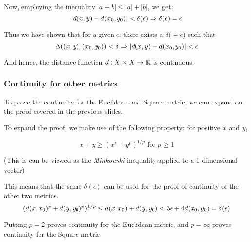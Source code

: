 \begin{frame}
    Now, employing the inequality \(|a+b|\leq |a|+|b|\), we get:
    \begin{equation*}
        |d(x, y) - d(x_0, y_0)| < \delta(\epsilon) \\
        \Rightarrow \delta(\epsilon) = \epsilon
    \end{equation*}

    Thus we have shown that for a given \(\epsilon\), there exists a \(\delta (= \epsilon\)) such that 
    \begin{equation*}
        \Delta((x, y), (x_0, y_0)) < \delta \Rightarrow |d(x, y) - d(x_0, y_0)| < \epsilon
    \end{equation*}

    And hence, the distance function \(d:X\times X \rightarrow \mathbb{R} \) is continuous.

\end{frame}


\begin{frame}
    \frametitle{Continuity for other metrics}

    To prove the continuity for the Euclidean and Square metric, we can expand on the proof covered in the previous slides.

    \pause
    To expand the proof, we make use of the following property:
    for positive \(x\) and \(y\),
     
    \begin{equation}
        x+y \geq (x^p+y^p)^{1/p} \text{ for } p \geq 1
    \end{equation}

    (This is can be viewed as the \textit{Minkowski} inequality applied to a 1-dimensional vector)

    \pause

    This means that the same \(\delta(\epsilon)\) can be used for the proof of continuity of the other two metrics.
    \begin{equation}
        (d(x, x_0)^p + d(y, y_0)^p)^{1/p} \leq d(x, x_0) + d(y, y_0) < 3\epsilon + 4d(x_0, y_0) = \delta(\epsilon)
    \end{equation}

    Putting \(p = 2\) proves continuity for the Euclidean metric, and \(p=\infty\) proves continuity for the Square metric
    
\end{frame}

